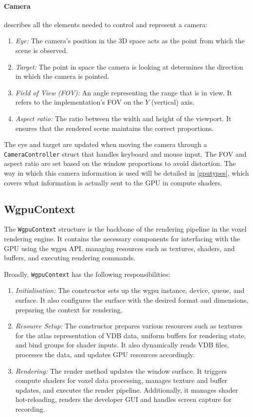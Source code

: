 \paragraph{Camera} describes all the elements needed to control and represent a camera:
\begin{enumerate}
    \item \emph{Eye:} The camera's position in the 3D space acts as the point from which the scene is observed.
    \item \emph{Target:} The point in space the camera is looking at determines the direction in which the camera is pointed.
    \item \emph{Field of View (FOV):} An angle representing the range that is in view. It refers to the implementation's FOV on the $Y$ (vertical) axis.\label{fov:def}
    \item \emph{Aspect ratio:} The ratio between the width and height of the viewport. It ensures that the rendered scene maintains the correct proportions.
\end{enumerate}
The eye and target are updated when moving the camera through a \verb|CameraController| struct that handles keyboard and mouse input. The FOV and aspect ratio are set based on the window proportions to avoid distortion. The way in which this camera information is used will be detailed in \cref{gputypes}, which covers what information is actually sent to the GPU in compute shaders.


\subsection{WgpuContext}
The \verb|WgpuContext| structure is the backbone of the rendering pipeline in the voxel rendering engine. It contains the necessary components for interfacing with the GPU using the wgpu API, managing resources such as textures, shaders, and buffers, and executing rendering commands.

Broadly, \verb|WgpuContext| has the following responsibilities:
\begin{enumerate}
  \item \emph{Initialisation:} The constructor sets up the wgpu instance, device, queue, and surface.
        It also configures the surface with the desired format and dimensions, preparing the context for rendering.
  \item \emph{Resource Setup:} The constructor prepares various resources such as textures for the atlas representation of VDB data, uniform buffers for rendering state, and bind groups for shader inputs.
        It also dynamically reads VDB files, processes the data, and updates GPU resources accordingly.
  \item \emph{Rendering:} The render method updates the window surface.
        It triggers compute shaders for voxel data processing, manages texture and buffer updates, and executes the render pipeline. Additionally, it manages shader hot-reloading, renders the developer GUI and handles screen capture for recording.
\end{enumerate}

